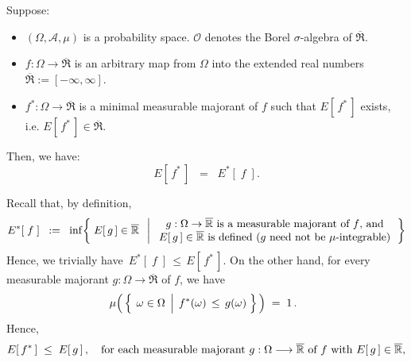 
\begin{theorem}
\mbox{}\vskip 0.1cm
\noindent
Suppose:
\begin{itemize}
\item
	$(\Omega,\mathcal{A},\mu)$ is a probability space.
	$\mathcal{O}$ denotes the Borel $\sigma$-algebra of $\overline{\Re}$.
\item
	$f : \Omega \longrightarrow \overline{\Re}$
	is an arbitrary map from $\Omega$ into the extended real numbers
	$\overline{\Re} := [-\infty,\infty]$.
\item
	$f^{*} : \Omega \longrightarrow \overline{\Re}$ is a minimal measurable majorant of $f$
	such that $E\!\left[\,f^{*}\,\right]$ exists, i.e. $E\!\left[\,f^{*}\,\right] \in \overline{\Re}$.
\end{itemize}
Then, we have:
\begin{equation*}
E\!\left[\,f^{*}\,\right] \;\; = \;\; E^{*}\!\left[\;f\;\right].
\end{equation*}
\end{theorem}
\proof
Recall that, by definition,
\begin{equation*}
E^{*}\!\left[\;f\;\right]
\;\; := \;\;
	\inf\!\left\{\;
		E\!\left[\,g\,\right] \in \overline{\Re}
		\;\;\left\vert\;
		\begin{array}{c}
			\textnormal{$g:\Omega\rightarrow\overline{\Re}$ is a measurable majorant of $f$, and}
			\\
			\textnormal{$E\!\left[\,g\,\right] \in \overline{\Re}$ is defined ($g$ need not be $\mu$-integrable)}
		\end{array}
		\right.
		\right\}
\end{equation*}
Hence, we trivially have \,$E^{*}\!\left[\;f\;\right] \,\leq\, E\!\left[\,f^{*}\,\right]$.
On the other hand, for every measurable majorant $g : \Omega\longrightarrow\overline{\Re}$ of $f$,
we have
\begin{equation*}
\mu\!\left(\,
	\left\{\;\left.\omega\overset{{\color{white}.}}{\in}\Omega\;\,\right\vert\; f^{*}(\omega) \,\leq\, g(\omega)\;\right\}
	\,\right)
\;=\;1\,.\;\;
\end{equation*}
Hence,
\begin{equation*}
E\!\left[\,f^{*}\,\right] \; \leq \; E\!\left[\,g\,\right],
\quad
\textnormal{for each measurable majorant $g:\Omega\longrightarrow\overline{\Re}$ of $f$
with $E\!\left[\,g\,\right] \in \overline{\Re}$,}
\end{equation*}
